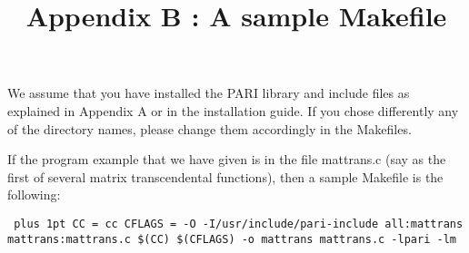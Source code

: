 \title{Appendix B : A sample Makefile}

We assume that you have installed the PARI library and include files
as explained in Appendix A or in the installation guide. If you chose
differently any of the directory names, please change them accordingly
in the Makefiles.

If the program example that we have given is in the file mattrans.c
(say as the first of several matrix transcendental functions), then
a sample Makefile is the following:

{\tt \obeylines\parskip=0pt plus 1pt
\hbox{}
CC = cc
CFLAGS = -O -I/usr/include/pari-include
\hbox{}
all:\qquad mattrans
\hbox{}
mattrans:\qquad	mattrans.c
\qquad	\$(CC) \$(CFLAGS) -o mattrans mattrans.c -lpari -lm
}

\vfill\eject










